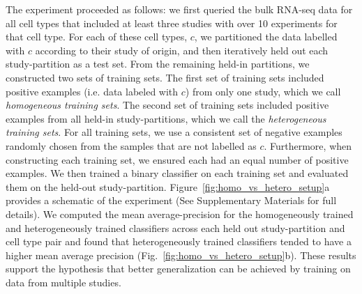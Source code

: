 The experiment proceeded as follows: we first queried the bulk RNA-seq data for all cell types that included at least three studies with over 10 experiments for that cell type. For each of these cell types, $c$, we partitioned the data labelled with $c$ according to their study of origin, and then iteratively held out each study-partition as a test set. From the remaining held-in partitions, we constructed two sets of training sets. The first set of training sets included positive examples (i.e. data labeled with $c$) from only one study, which we call \textit{homogeneous training sets}. The second set of training sets included positive examples from all held-in study-partitions, which we call the \textit{heterogeneous training sets}. For all training sets, we use a consistent set of negative examples randomly chosen from the samples that are not labelled as $c$.  Furthermore, when constructing each training set, we ensured each had an equal number of positive examples. We then trained a binary classifier on each training set and evaluated them on the held-out study-partition. Figure~\ref{fig:homo_vs_hetero_setup}a provides a schematic of the experiment (See Supplementary Materials for full details).  We computed the mean average-precision for the homogeneously trained and heterogeneously trained classifiers across each held out study-partition and cell type pair and  found that heterogeneously trained classifiers tended to have a higher mean average precision (Fig.~\ref{fig:homo_vs_hetero_setup}b).  These results support the hypothesis that better generalization can be achieved by training on data from multiple studies.

